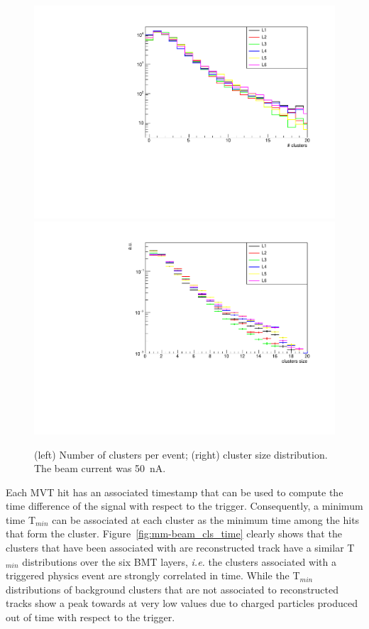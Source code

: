\begin{figure}[htb]
 \includegraphics[width=.49\columnwidth,keepaspectratio]{images/beam_num_cls.pdf}
 \includegraphics[width=.49\columnwidth,keepaspectratio]{images/beam_cls_size.pdf}
 \caption{(left) Number of clusters per event; (right) cluster size distribution. The beam current was 50~nA.}
 \label{fig:mm-beam_cls}
\end{figure}

Each MVT hit has an associated timestamp that can be used to compute the time difference of the signal with respect to the trigger. Consequently, a minimum time T$_{min}$ can be associated at each cluster as the minimum time among the hits that form the cluster. Figure~\ref{fig:mm-beam_cls_time} clearly shows that the clusters that have been associated with are reconstructed track have a similar T$_{min}$ distributions over the six BMT layers, \emph{i.e.} the clusters associated with a triggered physics event are strongly correlated in time. While the T$_{min}$ distributions of background clusters that are not associated to reconstructed tracks show a peak towards at very low values due to charged particles produced out of time with respect to the trigger.

